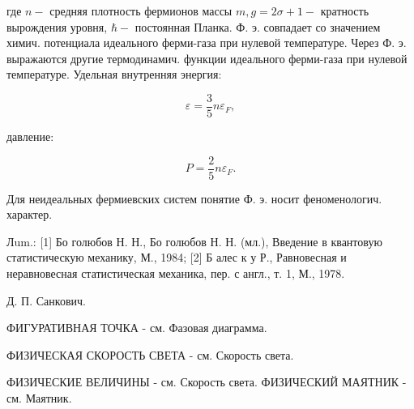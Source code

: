 \documentclass[10pt]{article}
\begin{document}
где $n-$ средняя плотность фермионов массы $m, g=2 \sigma+1-$ кратность вырождения уровня, $\hbar-$ постоянная Планка. Ф. э. совпадает со значением химич. потенциала идеального ферми-газа при нулевой температуре. Через Ф. э. выражаются другие термодинамич. функции идеального ферми-газа при нулевой температуре. Удельная внутренняя энергия:



\[

\varepsilon=\frac{3}{5} n \varepsilon_{F},

\]



давление:



\[

P=\frac{2}{5} n \varepsilon_{F} .

\]



Для неидеальных фермиевских систем понятие Ф. э. носит феноменологич. характер.



Лum.: [1] Бо голюбов Н. Н., Бо голюбов Н. Н. (мл.), Введение в квантовую статистическую механику, М., 1984; [2] Б алес к у Р., Равновесная и неравновесная статистическая механика, пер. с англ., т. 1, М., 1978.



Д. П. Санкович.



ФИГУРАТИВНАЯ ТОЧКА - см. Фазовая диаграмма.



ФИЗИЧЕСКАЯ СКОРОСТЬ СВЕТА - см. Скорость света.



ФИЗИЧЕСКИЕ ВЕЛИЧИНЫ - см. Скорость света. ФИЗИЧЕСКИЙ МАЯТНИК - см. Маятник.
\end{document}
